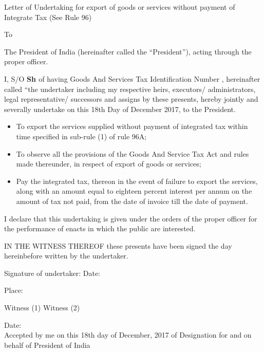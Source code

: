 \documentclass[a4paper,11pt] {report}
\begin{document}
\vspace*{2cm}
\bigskip
\bigskip

\begin{center}
  Letter of Undertaking for export of goods or services without payment of Integrate Tax \linebreak
  (See Rule 96)
\end{center}
To

The President of India (hereinafter called the “President”),\linebreak
acting through the proper officer.
\bigbreak

I, {\bf{\myname}} S/O {\bf{Sh \myfathersname}} of
\underline{\myaddress} having Goods And Services Tax Identification
Number \underline{\mygstin}, hereinafter called “the undertaker
including my respective heirs, executors/ administrators, legal
representative/ successors and assigns by these presents, hereby
jointly and severally undertake on this 18th Day of December 2017, to
the President.

\begin{itemize}
\item To export the services supplied without payment of integrated
  tax within time specified in sub-rule (1) of rule 96A;
\item To observe all the provisions of the Goods And Service Tax Act and
  rules made thereunder, in respect of export of goods or services;
\item Pay the integrated tax, thereon in the event of failure to
  export the services, along with an amount equal to eighteen percent
  interest per annum on the amount of tax not paid, from the date of
  invoice till the date of payment.
\end{itemize}

I declare that this undertaking is given under the orders of the
proper officer for the performance of enacts in which the public are
interested. 

IN THE WITNESS THEREOF these presents have been signed
the day hereinbefore written by the undertaker.

Signature of undertaker:
\bigbreak
\bigbreak
Date: \DayAfter[0]

Place: \myplace

Witness (1) \hfill Witness (2)
\bigbreak
\bigbreak
\bigbreak

Date: \DayAfter[0]
\\Accepted by me on this 18th day of December, 2017 of Designation for and on behalf of President of India
\end{document}

